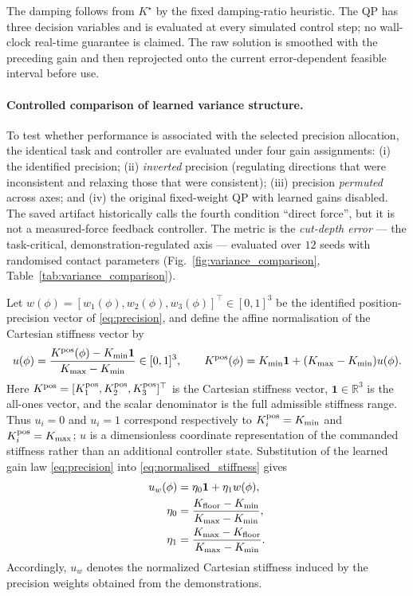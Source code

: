 \documentclass[11pt,a4paper]{article}
\newcommand{\R}{\mathbb{R}}
\begin{document}
The damping follows from $K^\star$ by the fixed damping-ratio heuristic. The QP
has three decision variables and is evaluated at every simulated control step;
no wall-clock real-time guarantee is claimed. The raw solution is smoothed with
the preceding gain and then reprojected onto the current error-dependent
feasible interval before use.

\paragraph{Controlled comparison of learned variance structure.}
To test whether performance is associated with the selected precision
allocation, the identical task and controller are evaluated under four gain assignments:
(i) the identified precision; (ii) \emph{inverted} precision (regulating
directions that were inconsistent and relaxing those that were consistent);
(iii) precision \emph{permuted} across axes; and (iv) the original fixed-weight
QP with learned gains disabled. The saved artifact historically calls the
fourth condition ``direct force'', but it is not a measured-force feedback
controller. The metric is the \emph{cut-depth error} --- the
task-critical, demonstration-regulated axis --- evaluated over $12$ seeds with
randomised contact parameters (Fig.~\ref{fig:variance_comparison},
Table~\ref{tab:variance_comparison}).

Let $w(\phi)=[w_1(\phi),w_2(\phi),w_3(\phi)]^\top\in[0,1]^3$ be the
identified position-precision vector of \eqref{eq:precision}, and define the
affine normalisation of the Cartesian stiffness vector by
\begin{equation}
u(\phi)
=\frac{K^{\rm pos}(\phi)-K_{\min}\mathbf 1}
       {K_{\max}-K_{\min}}\in[0,1]^3,
\qquad
K^{\rm pos}(\phi)
=K_{\min}\mathbf1+(K_{\max}-K_{\min})u(\phi).
\label{eq:normalised_stiffness}
\end{equation}
Here $K^{\rm pos}=[K^{\rm pos}_1,K^{\rm pos}_2,K^{\rm pos}_3]^\top$ is the
Cartesian stiffness vector, $\mathbf 1\in\R^3$ is the all-ones vector, and the
scalar denominator is the full admissible stiffness range. Thus $u_i=0$ and
$u_i=1$ correspond respectively to $K_i^{\rm pos}=K_{\min}$ and
$K_i^{\rm pos}=K_{\max}$; $u$ is a dimensionless coordinate representation of
the commanded stiffness rather than an additional controller state.
Substitution of the learned gain law \eqref{eq:precision} into
\eqref{eq:normalised_stiffness} gives
\begin{equation}
\begin{aligned}
u_w(\phi)&=\eta_0\mathbf1+\eta_1w(\phi),\\
\eta_0&=\frac{K_{\rm floor}-K_{\min}}{K_{\max}-K_{\min}},\\
\eta_1&=\frac{K_{\max}-K_{\rm floor}}{K_{\max}-K_{\min}} .
\end{aligned}
\label{eq:identified_normalised_allocation}
\end{equation}
Accordingly, $u_w$ denotes the normalized Cartesian stiffness induced by the
precision weights obtained from the demonstrations.
\end{document}
